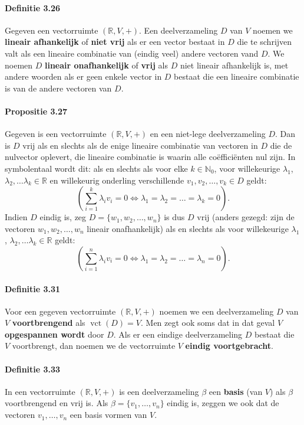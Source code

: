 \documentclass[11pt,oneside,a4paper]{article}
\DeclareMathOperator{\vct}{vct}
\begin{document}
	\paragraph{Definitie 3.26}
		Gegeven een vectorruimte $(\mathbb{R}, V, +)$. Een deelverzameling $D$ van $V$ noemen we \textbf{lineair afhankelijk} of \textbf{niet vrij} als er een vector bestaat in $D$ die te schrijven valt als een lineaire combinatie van (eindig veel) andere vectoren vand $D$. We noemen $D$ \textbf{lineair onafhankelijk} of \textbf{vrij} als $D$ niet lineair afhankelijk is, met andere woorden als er geen enkele vector in $D$ bestaat die een lineaire combinatie is van de andere vectoren van $D$.
	\paragraph{Propositie 3.27}
		Gegeven is een vectorruimte $(\mathbb{R}, V, +)$ en een niet-lege deelverzameling $D$. Dan is $D$ vrij als en slechts als de enige lineaire combinatie van vectoren in $D$ die de nulvector oplevert, die lineaire combinatie is waarin alle coëfficiënten nul zijn. In symbolentaal wordt dit: als en slechts als voor elke $k\in \mathbb{N}_0$, voor willekeurige $\lambda_1$, $\lambda_2, \ldots \lambda_k \in \mathbb{R}$ en willekeurig onderling verschillende $v_1, v_2, \ldots, v_k \in D$ geldt:
		$$\left(\sum\limits_{i=1}^k \lambda_iv_i=0 \Leftrightarrow \lambda_1 = \lambda_2 = \ldots = \lambda_k = 0 \right).$$
		Indien $D$ eindig is, zeg $D = \{w_1,w_2,\ldots ,w_n\}$ is dus $D$ vrij (anders gezegd: zijn de vectoren $w_1,w_2,\ldots ,w_n$ lineair onafhankelijk) als en slechts als voor willekeurige $\lambda_1$, $\lambda_2, \ldots \lambda_k \in \mathbb{R}$ geldt:
		$$\left(\sum\limits_{i=1}^n \lambda_iv_i=0 \Leftrightarrow \lambda_1 = \lambda_2 = \ldots = \lambda_n = 0 \right).$$
	\paragraph{Definitie 3.31}
		Voor een gegeven vectorruimte $(\mathbb{R}, V, +)$ noemen we een deelverzameling $D$ van $V$ \textbf{voortbrengend} als $\vct(D) =V$. Men zegt ook soms dat in dat geval $V$ \textbf{opgespannen wordt} door $D$. Als er een eindige deelverzameling $D$ bestaat die $V$ voortbrengt, dan noemen we de vectorruimte $V$ \textbf{eindig voortgebracht}.
	\paragraph{Definitie 3.33}
		In een vectorruimte $(\mathbb{R}, V, +)$ is een deelverzameling $\beta$ een \textbf{basis} (van $V$) als $\beta$ voortbrengend en vrij is. Als $\beta = \{v_1,\ldots ,v_n\}$ eindig is, zeggen we ook dat de vectoren $v_1, \ldots ,v_n$ een basis vormen van $V$.
\end{document}
